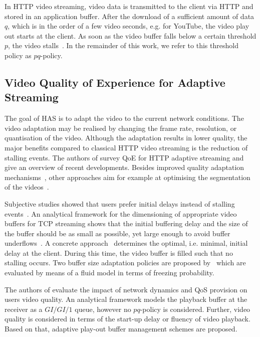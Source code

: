 In \gls{HTTP} video streaming, video data is transmitted to the client via \gls{HTTP} and stored in an application buffer.
After the download of a sufficient amount of data \(q\), which is in the order of a few video seconds, e.g. for YouTube, the video play out starts at the client.
As soon as the video buffer falls below a certain threshold \(p\), the video stalls~\cite{Hossfeld2013c}.
In the remainder of this work, we refer to this threshold policy as \(pq\)-policy.

\subsection{Video Quality of Experience for  Adaptive Streaming}\label{sec:application:background:application_qoe}
The goal of \gls{HAS} is to adapt the video to the current network conditions.
The video adaptation may be realised by changing the frame rate, resolution, or quantisation of the video. Although the adaptation results in lower quality, the major benefits compared to classical \gls{HTTP} video streaming is the reduction of stalling events.
The authors of \cite{Seufert2014} survey \gls{QoE} for \gls{HTTP} adaptive streaming and give an overview of recent developments.
Besides improved quality adaptation mechanisms~\cite{Sieber2013}, other approaches aim for example at optimising the segmentation of the videos~\cite{Lievens2013}.

Subjective studies showed that users prefer initial delays instead of stalling events~\cite{Hossfeld2012c}.
An analytical framework for the dimensioning of appropriate video buffers for \gls{TCP} streaming shows that the initial buffering delay and the size of the buffer should be as small as possible, yet large enough to avoid buffer underflows~\cite{Yan2011}.
A concrete approach~\cite{Hossfeld2012b} determines the optimal, i.e. minimal, initial delay at the client.
During this time, the video buffer is filled such that no stalling occurs.
Two buffer size adaptation policies are proposed by~\cite{Fiedler2014} which are evaluated by means of a fluid model in terms of freezing probability.

The authors of \cite{Luan2010} evaluate the impact of network dynamics and \gls{QoS} provision on users video quality.
An analytical framework models the playback buffer at the receiver as a \(GI/GI/1\) queue, however no \(pq\)-policy is considered.
Further, video quality is considered in terms of the start-up delay or fluency of video playback.
Based on that, adaptive play-out buffer management schemes are proposed.

